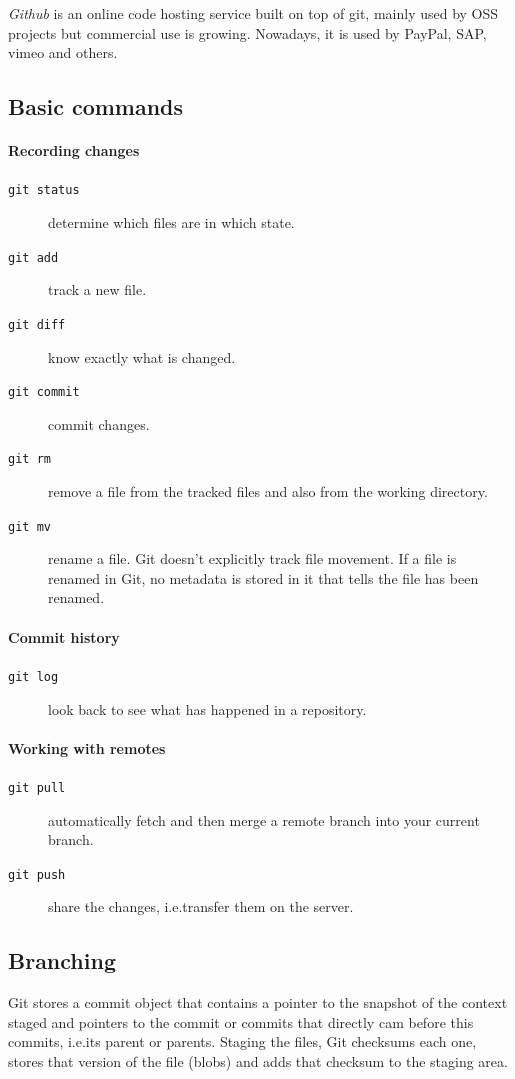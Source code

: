 \emph{Github} is an online code hosting service built on top of git, mainly used by OSS projects but commercial use is growing. Nowadays, it is used by PayPal, SAP, vimeo and others.

\subsection{Basic commands}
\paragraph{Recording changes}
\begin{description}
\item [\texttt{git status}] determine which files are in which state.
\item [\texttt{git add}] track a new file.
\item [\texttt{git diff}] know exactly what is changed.
\item [\texttt{git commit}] commit changes.
\item [\texttt{git rm}] remove a file from the tracked files and also from the working directory.
\item [\texttt{git mv}] rename a file. Git doesn't explicitly track file movement. If a file is renamed in Git, no metadata is stored in it that tells the file has been renamed.
\end{description}

\paragraph{Commit history}
\begin{description}
\item [\texttt{git log}] look back to see what has happened in a repository.
\end{description}

\paragraph{Working with remotes}
\begin{description}
\item [\texttt{git pull}] automatically fetch and then merge a remote branch into your current branch.
\item [\texttt{git push}] share the changes, i.e.\@ transfer them on the server.
\end{description}

\subsection{Branching}
Git stores a commit object that contains a pointer to the snapshot of the context staged and pointers to the commit or commits that directly cam before this commits, i.e.\@ its parent or parents. Staging the files, Git checksums each one, stores that version of the file (blobs) and adds that checksum to the staging area.

